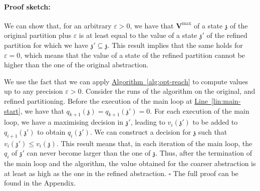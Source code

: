 \documentclass[10pt,twocolumn]{article}
\newenvironment{proofsketch}{\paragraph{Proof sketch:}}{\hfill$\square$}
\newcommand{\mvalue}{\mathbf{V}}
\newcommand{\precision}{\varepsilon}
\newcommand{\astate}{\mathfrak{z}}
\newcommand{\refalg}[1]{\texorpdfstring{\hyperref[alg:#1]{Algorithm~\ref*{alg:#1}}}{Algorithm~\ref*{alg:#1}}}
\newcommand{\reflin}[1]{\texorpdfstring{\hyperref[lin:#1]{Line~\ref*{lin:#1}}}{Line~\ref*{lin:#1}}}
\begin{document}
\begin{proofsketch}
  We can show that, for an arbitrary $\precision > 0$, we have that $\mvalue^{\max}$ of a state $\astate$ 
  of the original partition plus $\precision$ is at least equal to the value of a state $\astate'$ of the 
  refined partition for which we have $\astate' \subseteq \astate$.
  This result implies that the same holds for $\precision = 0$, which means that the value of 
  a state of the refined partition cannot be higher than the one of the original abstraction.

  We use the fact that we can apply \refalg{opt-reach} to compute values up to any precision $\precision > 0$.
  Consider the runs of the algorithm on the original, and refined partitioning.
  Before the execution of the main loop at \reflin{main-start}, we have that 
  $q_{k+1}(\astate) = q_{k+1}(\astate') = 0$. For each execution of the main loop, 
  we have a maximising decision in $\astate'$, leading to $v_i(\astate')$ to be 
  added to $q_{i+1}(\astate')$ to obtain $q_i(\astate')$.
  We can construct a decision for $\astate$ such that $v_i(\astate')\leq v_i(\astate)$.
  This result means that, in each iteration of the main loop, the $q_i$ of $\astate'$ 
  can never become larger than the one of $\astate$. Thus, after the termination of 
  the main loop and the algorithm, the value obtained for the coarser abstraction is 
  at least as high as the one in the refined abstraction.
\end{proofsketch}
  The full proof can be found in the Appendix.
\end{document}
